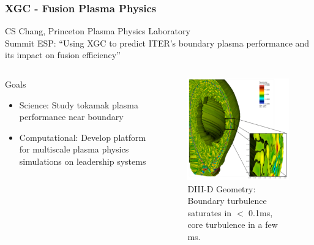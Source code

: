 \documentclass[aspectratio=169]{beamer}
\begin{document}
\begin{frame}
  \frametitle{XGC - Fusion Plasma Physics}
  CS Chang, Princeton Plasma Physics Laboratory \\
  Summit ESP: ``Using XGC to predict ITER’s boundary plasma performance and its impact on fusion efficiency''
  \begin{columns}
    \begin{column}{0.5\textwidth}
      Goals
      \begin{itemize}
        \item Science: Study tokamak plasma performance near boundary
	\item Computational: Develop platform for multiscale plasma physics simulations on leadership systems
      \end{itemize}
    \end{column}
    \begin{column}{0.5\textwidth}
      \begin{figure}
        \centering
        \includegraphics[width=.7\textwidth]{figures/xgcCase.png} \\
        \tiny{DIII-D Geometry: Boundary turbulence saturates
        in $<$ 0.1ms, core turbulence in a few ms.}
      \end{figure}
    \end{column}
  \end{columns}
\end{frame}
\end{document}
